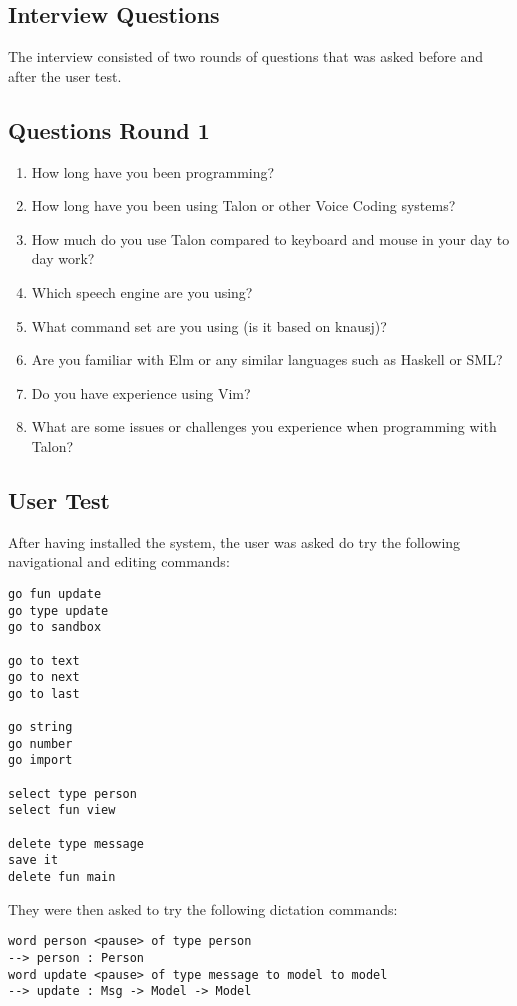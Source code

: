 
\appendix
\begin{appendices}
\chapter{Interview Questions}
The interview consisted of two rounds of questions that was asked
before and after the user test.

\section{Questions Round 1}
\begin{enumerate}[label*=Q1.\arabic*]
    \item How long have you been programming?
    \item How long have you been using Talon or other Voice Coding systems?
    \item How much do you use Talon compared to keyboard and mouse in your day to day work?
    \item Which speech engine are you using?
    \item What command set are you using (is it based on knausj)?
    \item Are you familiar with Elm or any similar languages such as Haskell or SML?
    \item Do you have experience using Vim?
    \item What are some issues or challenges you experience when programming with Talon?
\end{enumerate}

\newpage
\section{User Test}

After having installed the system, the user was asked do try the following
navigational and editing commands:
\begin{verbatim}
go fun update
go type update
go to sandbox

go to text
go to next
go to last

go string
go number
go import

select type person
select fun view

delete type message
save it
delete fun main
\end{verbatim}
They were then asked to try the following dictation commands:
\begin{verbatim}
word person <pause> of type person 
--> person : Person
word update <pause> of type message to model to model 
--> update : Msg -> Model -> Model
\end{verbatim}

\end{appendices}
